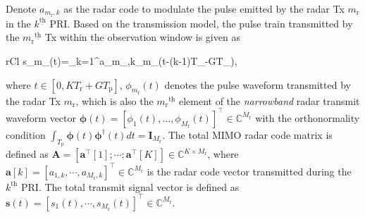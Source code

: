 \documentclass[10pt,journal]{IEEEtran}
\newcommand{\paren}[1]{\left({#1}\right)}
\newcommand{\bracket}[1]{{\left [{#1}\right ]}}
\newcommand{\ith}[1]    {{#1}^{\underline{\text{th}}}}
\newcommand{\rr}{_\mathrm{r}}
\theoremstyle{definition}
\begin{document}
	Denote $a_{m\rr,k}$ as the radar code to modulate the pulse emitted by the radar Tx $m\rr$ in the $\ith{k}$ PRI. Based on the transmission model, the pulse train transmitted by the $\ith{m_\mathrm{r}}$ Tx within the observation window is given as
	\par\noindent\small
	\begin{IEEEeqnarray}{rCl}
		s_{m_}\paren{t}=\sum_{k=1}^{}a_{m_,k}\phi_{m_}\paren{t-\paren{k-1}T\rr-GT_{}},
	\end{IEEEeqnarray}\normalsize 
	where $t\in\bracket{0,KT\rr+GT_{\mathrm{p}}}$, $\phi_{m_\mathrm{r}}\paren{t}$ denotes the pulse waveform transmitted by the radar Tx $m\rr$, which is also 
	the $\ith{m_\mathrm{r}}$ element of the  \textit{narrowband} radar transmit waveform vector $\boldsymbol{\phi}(t)=\left[ \phi_1(t),\dots,\phi_{M_\mathrm{r}}(t)\right]^\top\in\mathbb{C}^{M\rr}$ with the orthonormality condition $\int_{T_\mathrm{p}}^{}\boldsymbol{\phi}(t)\boldsymbol{\phi}^\dagger(t)dt=\mathbf{I}_{M_\mathrm{r}}$. The total MIMO radar code matrix is defined as $\mathbf{A}=\bracket{\mathbf{a}^\top\bracket{1};\cdots; \mathbf{a}^\top\bracket{\mathrm{\mathit{K}}}}\in\mathbb{C}^{\mathit{K}\times \mathit{M}\rr}$, where $\mathbf{a}\bracket{k}=\bracket{a_{1,k},\cdots,a_{\mathit{M}\rr,k}}^\top\in\mathbb{C}^{M\rr}$ is the radar code vector transmitted during the $\ith{k}$ PRI.  The total transmit signal vector is defined as $\mathbf{s}(t)=\bracket{s_1(t),\cdots,s_{M_\mathrm{r}}(t)}^\top\in\mathbb{C}^{M\rr}$. 
	
\end{document}
